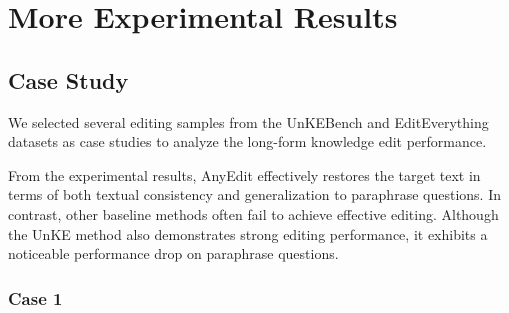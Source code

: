 \section{More Experimental Results}\label{app:exp_result}
\subsection{Case Study}

We selected several editing samples from the UnKEBench and EditEverything datasets as case studies to analyze the long-form knowledge edit performance. 

From the experimental results, AnyEdit effectively restores the target text in terms of both textual consistency and generalization to paraphrase questions. In contrast, other baseline methods often fail to achieve effective editing. Although the UnKE method also demonstrates strong editing performance, it exhibits a noticeable performance drop on paraphrase questions.


\subsubsection{Case 1}

